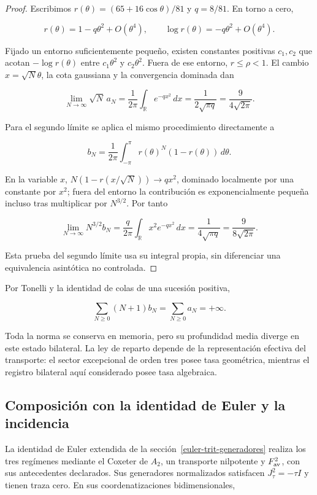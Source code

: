 \begin{proof}
Escribimos \(r(\theta)=(65+16\cos\theta)/81\) y \(q=8/81\). En torno a cero,

\[
r(\theta)=1-q\theta^2+O(\theta^4),\qquad
\log r(\theta)=-q\theta^2+O(\theta^4).
\]

Fijado un entorno suficientemente pequeño, existen constantes positivas \(c_1,c_2\) que acotan \(-\log r(\theta)\) entre \(c_1\theta^2\) y \(c_2\theta^2\). Fuera de ese entorno, \(r\leq\rho<1\). El cambio \(x=\sqrt N\theta\), la cota gaussiana y la convergencia dominada dan

\[
\lim_{N\to\infty}\sqrt N\,a_N
=\frac1{2\pi}\int_{\mathbb R}e^{-qx^2}\,dx
=\frac1{2\sqrt{\pi q}}=\frac9{4\sqrt{2\pi}}.
\]

Para el segundo límite se aplica el mismo procedimiento directamente a

\[
b_N=\frac1{2\pi}\int_{-\pi}^{\pi}r(\theta)^N(1-r(\theta))\,d\theta.
\]

En la variable \(x\), \(N(1-r(x/\sqrt N))\to qx^2\), dominado localmente por una constante por \(x^2\); fuera del entorno la contribución es exponencialmente pequeña incluso tras multiplicar por \(N^{3/2}\). Por tanto

\[
\lim_{N\to\infty}N^{3/2}b_N
=\frac q{2\pi}\int_{\mathbb R}x^2e^{-qx^2}\,dx
=\frac1{4\sqrt{\pi q}}=\frac9{8\sqrt{2\pi}}.
\]

Esta prueba del segundo límite usa su integral propia, sin diferenciar una equivalencia asintótica no controlada.
\end{proof}

Por Tonelli y la identidad de colas de una sucesión positiva,

\begin{equation}
\sum_{N\geq0}(N+1)b_N=\sum_{N\geq0}a_N=+\infty.
\label{nuc03:eq:21}
\end{equation}

Toda la norma se conserva en memoria, pero su profundidad media diverge en este estado bilateral. La ley de reparto depende de la representación efectiva del transporte: el sector excepcional de orden tres posee tasa geométrica, mientras el registro bilateral aquí considerado posee tasa algebraica.

\subsection{Composición con la identidad de Euler y la incidencia}

La identidad de Euler extendida de la sección~\ref{euler-trit-generadores} realiza los tres regímenes mediante el Coxeter de \(A_2\), un transporte nilpotente y \(F_{\rm av}^2\), con sus antecedentes declarados. Sus generadores normalizados satisfacen \(J_\tau^2=-\tau I\) y tienen traza cero. En sus coordenatizaciones bidimensionales,

